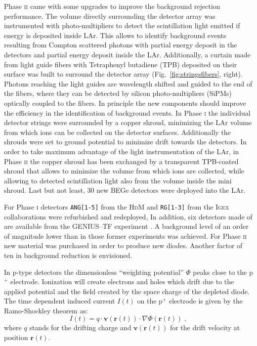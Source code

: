 Phase \textsc{ii} came with some upgrades to improve the background rejection performance. The volume directly surrounding the detector array was instrumented with photo-multipliers to detect the scintillation light emitted if energy is deposited inside LAr. This allows to identify background events resulting from Compton scattered photons with partial energy deposit in the detectors and partial energy deposit inside the LAr. Additionally, a curtain made from light guide fibers with Tetraphenyl butadiene (TPB) deposited on their surface was built to surround the detector array (Fig.~\ref{fig:stringsfibers}, right). Photons reaching the light guides are wavelength shifted and guided to the end of the fibers, where they can be detected by silicon photo-multipliers (SiPMs) optically coupled to the fibers. In principle the new components should improve the efficiency in the identification of background events. In Phase \textsc{i} the individual detector strings were surrounded by a copper shroud, minimizing the LAr volume from which  ions can be collected on the detector surfaces. Additionally the shrouds were set to ground potential to minimize drift towards the detectors. In order to take maximum advantage of the light instrumentation of the LAr, in Phase \textsc{ii} the copper shroud has been exchanged by a transparent TPB-coated shroud that allows to minimize the volume from which  ions are collected, while allowing to detected scintillation light also from the volume inside the mini shroud. Last but not least, 30 new BEGe detectors were deployed into the LAr.

 For Phase \textsc{i} detectors \texttt{ANG[1-5]} from the \textsc{HdM} \cite{hdm} and \texttt{RG[1-3]} from the \textsc{Igex} \cite{igex} collaborations were refurbished and redeployed, In addition, six detectors made of  are available from the GENIUS--TF experiment \cite{genius1, genius2}. A background level of an order of magnitude lower than in those former experiments was achieved. For Phase \textsc{ii} new material was purchased in order to produce new diodes. Another factor of ten in background reduction is envisioned.

In p-type detectors the dimensionless ``weighting potential'' $\Phi$ peaks close to the p$^+$ electrode. Ionization will create electrons and holes which drift due to the applied potential and the field created by the space charge of the depleted diode. The time dependent induced current $I(t)$ on the p$^+$ electrode is given by the Ramo-Shockley theorem \cite{schockley-ramo} as:
\[I(t)=q\cdot\mathbf{v}(\mathbf{r}(t))\cdot\nabla\Phi(\mathbf{r}(t))\;,\]
where $q$ stands for the drifting charge and $\mathbf{v}(\mathbf{r}(t))$ for the drift velocity at position $\mathbf{r}(t)$.

